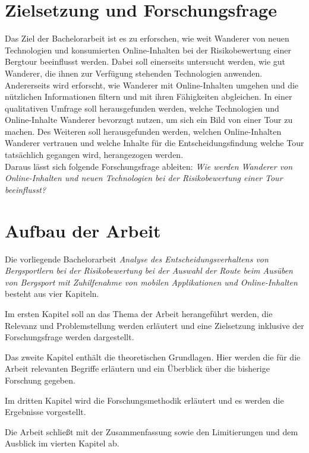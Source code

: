 \section{Zielsetzung und Forschungsfrage}


Das Ziel der Bachelorarbeit ist es zu erforschen, wie weit  Wanderer von neuen Technologien und konsumierten Online-Inhalten bei der Risikobewertung einer Bergtour beeinflusst werden. Dabei soll einerseits untersucht werden, wie gut Wanderer, die ihnen zur Verfügung stehenden Technologien anwenden. Andererseits wird erforscht, wie Wanderer mit Online-Inhalten umgehen und die nützlichen Informationen filtern und mit ihren Fähigkeiten abgleichen. In einer qualitativen Umfrage soll herausgefunden werden, welche Technologien und Online-Inhalte Wanderer bevorzugt nutzen, um sich ein Bild von einer Tour zu machen. Des Weiteren soll herausgefunden werden, welchen Online-Inhalten Wanderer vertrauen und welche Inhalte für die Entscheidungsfindung welche Tour tatsächlich gegangen wird, herangezogen werden.\\
Daraus lässt sich folgende Forschungsfrage ableiten: 
\textit{Wie werden Wanderer von Online-Inhalten und neuen Technologien bei der Risikobewertung einer Tour beeinflusst?}

\section{Aufbau der Arbeit}

Die vorliegende Bachelorarbeit \textit{Analyse des Entscheidungsverhaltens von Bergsportlern bei der Risikobewertung bei der Auswahl der Route beim Ausüben von Bergsport mit Zuhilfenahme von mobilen Applikationen und Online-Inhalten} besteht aus vier Kapiteln.\par

Im ersten Kapitel soll an das Thema der Arbeit herangeführt werden, die Relevanz und Problemstellung werden erläutert und eine Zielsetzung inklusive der Forschungsfrage werden dargestellt.\par

Das zweite Kapitel enthält die theoretischen Grundlagen. Hier werden die für die Arbeit relevanten Begriffe erläutern und ein Überblick über die bisherige Forschung gegeben.\par

Im dritten Kapitel wird die Forschungsmethodik erläutert und es werden die Ergebnisse vorgestellt.

 Die Arbeit schließt mit der Zusammenfassung sowie den Limitierungen und dem Ausblick im vierten Kapitel ab.


